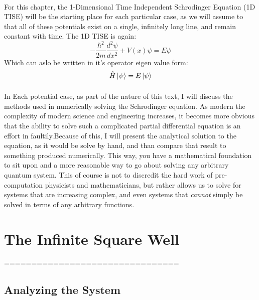 \documentclass[12pt,letterpaper]{book}
\begin{document}
\paragraph*{}For this chapter, the 1-Dimensional Time Independent Schrodinger Equation (1D TISE) will be the starting place for each particular case, as we will assume to that all of these potentials exist on a single, infinitely long line, and remain constant with time. The 1D TISE is again:
\begin{equation}
\label{1D TISE}
-\frac{\hbar^2}{2m}\frac{d^2 \psi}{dx^2} + V(x)\psi = E\psi
\end{equation}
Which can aslo be written in it's operator eigen value form:
\begin{equation}
\label{1D TISE Eigen}
\hat{H}\ket{\psi} = E\ket{\psi}
\end{equation}
\paragraph*{}In Each potential case, as part of the nature of this text, I will discuss the methods used in numerically solving the Schrodinger equation. As modern the complexity of modern science and engineering increases, it becomes more obvious that the ability to solve such a complicated partial differential equation is an effort in faultily.Because of this, I will present the analytical solution to the equation, as it would be solve by hand, and than compare that result to something produced numerically. This way, you have a mathematical foundation to sit upon and a more reasonable way to go about solving any arbitrary quantum system. This of course is not to discredit the hard work of pre-computation physicists and mathematicians, but rather allows us to solve for systems that are increasing complex, and even systems that \textit{cannot} simply be solved in terms of any arbitrary functions.


\section{The Infinite Square Well}

================================

\subsection*{Analyzing the System}
\end{document}
